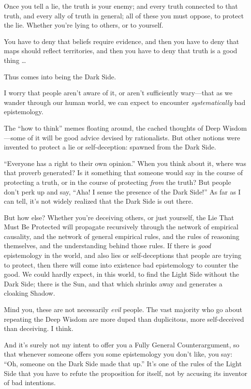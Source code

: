 {
 Once you tell a lie, the truth is your enemy; and every truth
connected to that truth, and every ally of truth in general; all of
these you must oppose, to protect the lie. Whether
you're lying to others, or to yourself.}

{
 You have to deny that beliefs require evidence, and then you have
to deny that maps should reflect territories, and then you have to deny
that truth is a good thing \ldots}

{
 Thus comes into being the Dark Side.}

{
 I worry that people aren't aware of it, or
aren't sufficiently wary---that as we wander through
our human world, we can expect to encounter \textit{systematically} bad
epistemology.}

{
 The ``how to think'' memes
floating around, the cached thoughts of Deep Wisdom---some of it will
be good advice devised by rationalists. But other notions were invented
to protect a lie or self-deception: spawned from the Dark Side.}

{
 ``Everyone has a right to their own
opinion.'' When you think about it, where was that
proverb generated? Is it something that someone would say in the course
of protecting a truth, or in the course of protecting \textit{from} the
truth? But people don't perk up and say,
``Aha! I sense the presence of the Dark
Side!'' As far as I can tell, it's
not widely realized that the Dark Side is out there.}

{
 But how else? Whether you're deceiving others, or
just yourself, the Lie That Must Be Protected will propagate
recursively through the network of empirical causality, and the network
of general empirical rules, and the rules of reasoning themselves, and
the understanding behind those rules. If there is \textit{good}
epistemology in the world, and also lies or self-deceptions that people
are trying to protect, then there will come into existence bad
epistemology to counter the good. We could hardly expect, in this
world, to find the Light Side without the Dark Side; there is the Sun,
and that which shrinks away and generates a cloaking Shadow.}

{
 Mind you, these are not necessarily \textit{evil} people. The vast
majority who go about repeating the Deep Wisdom are more duped than
duplicitous, more self-deceived than deceiving. I think.}

{
 And it's surely not my intent to offer you a Fully
General Counterargument, so that whenever someone offers you some
epistemology you don't like, you say:
``Oh, someone on the Dark Side made that
up.'' It's one of the rules of the
Light Side that you have to refute the proposition for itself, not by
accusing its inventor of bad intentions.}


